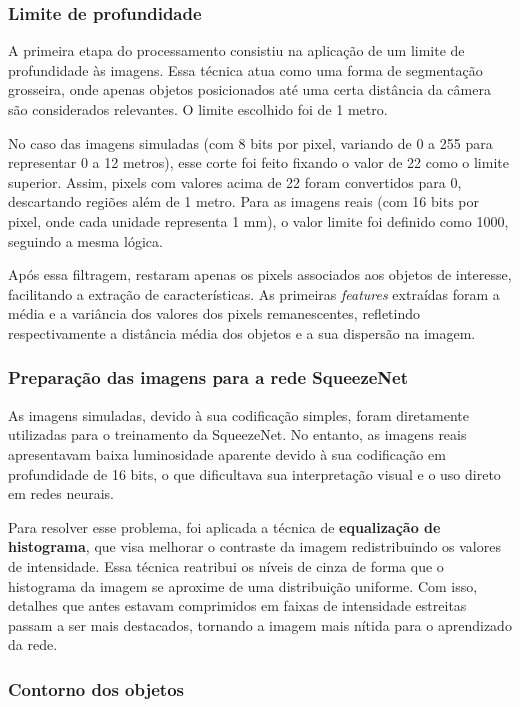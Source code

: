 \subsubsection{Limite de profundidade}

A primeira etapa do processamento consistiu na aplicação de um limite de profundidade às imagens. Essa técnica atua como uma forma de segmentação grosseira, onde apenas objetos posicionados até uma certa distância da câmera são considerados relevantes. O limite escolhido foi de 1 metro.

No caso das imagens simuladas (com 8 bits por pixel, variando de 0 a 255 para representar 0 a 12 metros), esse corte foi feito fixando o valor de 22 como o limite superior. Assim, pixels com valores acima de 22 foram convertidos para 0, descartando regiões além de 1 metro. Para as imagens reais (com 16 bits por pixel, onde cada unidade representa 1 mm), o valor limite foi definido como 1000, seguindo a mesma lógica.

Após essa filtragem, restaram apenas os pixels associados aos objetos de interesse, facilitando a extração de características. As primeiras \textit{features} extraídas foram a média e a variância dos valores dos pixels remanescentes, refletindo respectivamente a distância média dos objetos e a sua dispersão na imagem.

\subsubsection{Preparação das imagens para a rede SqueezeNet}

As imagens simuladas, devido à sua codificação simples, foram diretamente utilizadas para o treinamento da SqueezeNet. No entanto, as imagens reais apresentavam baixa luminosidade aparente devido à sua codificação em profundidade de 16 bits, o que dificultava sua interpretação visual e o uso direto em redes neurais.

Para resolver esse problema, foi aplicada a técnica de \textbf{equalização de histograma}, que visa melhorar o contraste da imagem redistribuindo os valores de intensidade. Essa técnica reatribui os níveis de cinza de forma que o histograma da imagem se aproxime de uma distribuição uniforme. Com isso, detalhes que antes estavam comprimidos em faixas de intensidade estreitas passam a ser mais destacados, tornando a imagem mais nítida para o aprendizado da rede.

\subsubsection{Contorno dos objetos}

